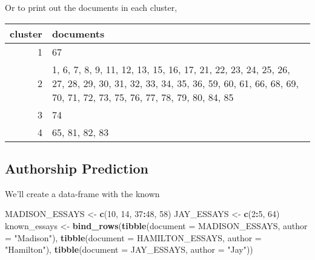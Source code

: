 \documentclass[]{book}
\newenvironment{Shaded}{\begin{snugshade}}{\end{snugshade}}
\newcommand{\DataTypeTok}[1]{\textcolor[rgb]{0.13,0.29,0.53}{#1}}
\newcommand{\DecValTok}[1]{\textcolor[rgb]{0.00,0.00,0.81}{#1}}
\newcommand{\KeywordTok}[1]{\textcolor[rgb]{0.13,0.29,0.53}{\textbf{#1}}}
\newcommand{\NormalTok}[1]{#1}
\newcommand{\OperatorTok}[1]{\textcolor[rgb]{0.81,0.36,0.00}{\textbf{#1}}}
\newcommand{\StringTok}[1]{\textcolor[rgb]{0.31,0.60,0.02}{#1}}
\theoremstyle{definition}
\theoremstyle{definition}
\theoremstyle{definition}
\theoremstyle{remark}
\begin{document}
Or to print out the documents in each cluster,

\begin{Shaded}
\end{Shaded}

\begin{tabular}{r|l}
\hline
cluster & documents\\
\hline
1 & 67\\
\hline
2 & 1, 6, 7, 8, 9, 11, 12, 13, 15, 16, 17, 21, 22, 23, 24, 25, 26, 27, 28, 29, 30, 31, 32, 33, 34, 35, 36, 59, 60, 61, 66, 68, 69, 70, 71, 72, 73, 75, 76, 77, 78, 79, 80, 84, 85\\
\hline
3 & 74\\
\hline
4 & 65, 81, 82, 83\\
\hline
\end{tabular}

\hypertarget{authorship-prediction}{%
\subsection{Authorship Prediction}\label{authorship-prediction}}

We'll create a data-frame with the known

\begin{Shaded}
\begin{Highlighting}[]
\NormalTok{MADISON_ESSAYS <-}\StringTok{ }\KeywordTok{c}\NormalTok{(}\DecValTok{10}\NormalTok{, }\DecValTok{14}\NormalTok{, }\DecValTok{37}\OperatorTok{:}\DecValTok{48}\NormalTok{, }\DecValTok{58}\NormalTok{)}
\NormalTok{JAY_ESSAYS <-}\StringTok{ }\KeywordTok{c}\NormalTok{(}\DecValTok{2}\OperatorTok{:}\DecValTok{5}\NormalTok{, }\DecValTok{64}\NormalTok{)}
\NormalTok{known_essays <-}\StringTok{ }\KeywordTok{bind_rows}\NormalTok{(}\KeywordTok{tibble}\NormalTok{(}\DataTypeTok{document =}\NormalTok{ MADISON_ESSAYS,}
                                 \DataTypeTok{author =} \StringTok{"Madison"}\NormalTok{),}
                          \KeywordTok{tibble}\NormalTok{(}\DataTypeTok{document =}\NormalTok{ HAMILTON_ESSAYS,}
                                 \DataTypeTok{author =} \StringTok{"Hamilton"}\NormalTok{),}
                          \KeywordTok{tibble}\NormalTok{(}\DataTypeTok{document =}\NormalTok{ JAY_ESSAYS,}
                                 \DataTypeTok{author =} \StringTok{"Jay"}\NormalTok{))}
\end{Highlighting}
\end{Shaded}
\end{document}

